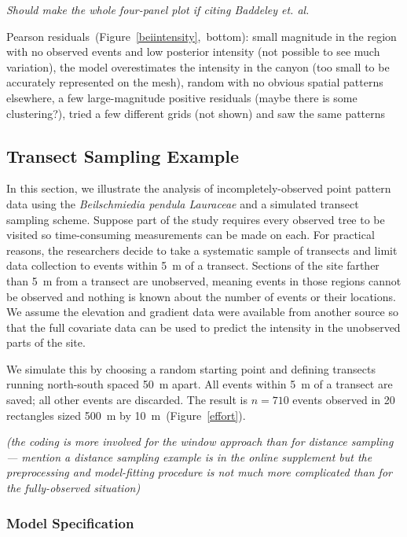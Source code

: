 \documentclass[]{interact}
\begin{document}
{\it Should make the whole four-panel plot if citing Baddeley et. al.}

Pearson residuals~(Figure~\ref{beiintensity},~bottom): small magnitude in the
region with no observed events and low posterior intensity (not possible to see
much variation), the model overestimates the intensity in the canyon (too small
to be accurately represented on the mesh), random with no obvious spatial
patterns elsewhere, a few large-magnitude positive residuals (maybe there is
some clustering?), tried a few different grids (not shown) and saw the same
patterns


\subsection{Transect Sampling Example}
\label{xsectanalysis}

In this section, we illustrate the analysis of incompletely-observed point
pattern data using the \emph{Beilschmiedia pendula Lauraceae} and a simulated
transect sampling scheme. Suppose part of the study requires every observed
tree to be visited so time-consuming measurements can be made on each. For
practical reasons, the researchers decide to take a systematic sample of
transects and limit data collection to events within 5~m of a transect.
Sections of the site farther than 5~m from a transect are unobserved, meaning
events in those regions cannot be observed and nothing is known about the
number of events or their locations. We assume the elevation and gradient data
were available from another source so that the full covariate data can be used
to predict the intensity in the unobserved parts of the site.

We simulate this by choosing a random starting point and defining transects
running north-south spaced 50~m apart. All events within 5~m of a transect are
saved; all other events are discarded. The result is \(n = 710\) events
observed in 20 rectangles sized 500~m by 10~m~(Figure~\ref{effort}).

{\it (the coding is more involved for the window approach than for distance
sampling --- mention a distance sampling example is in the online supplement
but the preprocessing and model-fitting procedure is not much more complicated
than for the fully-observed situation)}


\subsubsection{Model Specification}
\end{document}
